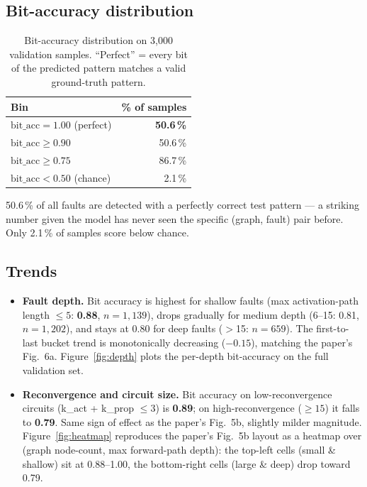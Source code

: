 \documentclass[11pt,a4paper]{article}
\newcommand{\bd}[1]{\textbf{#1}}
\begin{document}
\subsection{Bit-accuracy distribution}

\begin{table}[htbp]
\centering
\caption{Bit-accuracy distribution on 3{,}000 validation samples.
``Perfect'' = every bit of the predicted pattern matches a valid
ground-truth pattern.}
\small
\begin{tabular}{@{}lr@{}}
\toprule
Bin                              & \% of samples \\
\midrule
$\mathrm{bit\_acc} = 1.00$ (perfect) & \bd{50.6\,\%} \\
$\mathrm{bit\_acc} \ge 0.90$         & 50.6\,\% \\
$\mathrm{bit\_acc} \ge 0.75$         & 86.7\,\% \\
$\mathrm{bit\_acc} <  0.50$ (chance) & 2.1\,\% \\
\bottomrule
\end{tabular}
\end{table}

50.6\,\% of all faults are detected with a perfectly correct test
pattern --- a striking number given the model has never seen the
specific (graph, fault) pair before. Only 2.1\,\% of samples score
below chance.

\subsection{Trends}
\label{sec:eval-trends}

\begin{itemize}[leftmargin=*,itemsep=2pt]
  \item \bd{Fault depth.} Bit accuracy is highest for shallow faults
        (max activation-path length $\le 5$: \bd{0.88}, $n=1{,}139$),
        drops gradually for medium depth (6--15: 0.81, $n=1{,}202$),
        and stays at 0.80 for deep faults ($>$15: $n=659$). The
        first-to-last bucket trend is monotonically decreasing
        ($-0.15$), matching the paper's Fig.~6a. Figure~\ref{fig:depth}
        plots the per-depth bit-accuracy on the full validation set.

  \item \bd{Reconvergence and circuit size.} Bit accuracy on
        low-reconvergence circuits (k\_act + k\_prop $\le 3$) is
        \bd{0.89}; on high-reconvergence ($\ge 15$) it falls to
        \bd{0.79}. Same sign of effect as the paper's Fig.~5b,
        slightly milder magnitude. Figure~\ref{fig:heatmap} reproduces
        the paper's Fig.~5b layout as a heatmap over (graph node-count,
        max forward-path depth): the top-left cells (small \& shallow)
        sit at 0.88--1.00, the bottom-right cells (large \& deep) drop
        toward 0.79.
\end{itemize}
\end{document}
